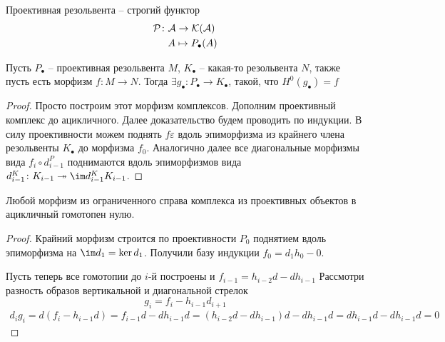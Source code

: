\documentclass[../main.tex]{subfiles}
\begin{document}
\begin{to_suj}\label{tactics}
    Проективная резольвента -- строгий функтор
    \begin{align*}
        \mathcal{P}\colon&\mathcal{A} \to\mathcal{K(A)}\\
         &A \mapsto P_\bullet(A)
    \end{align*}
\end{to_suj}
\begin{to_lem}
    Пусть $P_\bullet$ -- проективная резольвента $M$, $K_\bullet$ -- какая-то резольвента $N$, также пусть есть морфизм $f \colon M \to N$. Тогда $\exists g_\bullet\colon P_\bullet\to K_\bullet$, такой, что $H^0(g_\bullet) = f$
\end{to_lem}
\begin{proof}
    Просто построим этот морфизм комплексов. Дополним проективный комплекс до ацикличного. Далее доказательство будем проводить по индукции.  В силу проективности можем поднять $f\varepsilon$ вдоль эпиморфизма из крайнего члена резольвенты $K_\bullet$ до морфизма $f_0$. Аналогично далее все диагональные морфизмы вида $f_i\circ d_{i-1}^P$ поднимаются вдоль эпиморфизмов вида $d_{i-1}^K\colon K_{i-1}\twoheadrightarrow \im d_{i-1}^K K_{i-1}$.
    \bee
    \eee
\end{proof} 
\begin{to_lem}\label{PtoAc}
    Любой морфизм из ограниченного справа комплекса из проективных объектов в ацикличный гомотопен нулю. 
\end{to_lem}
\begin{proof}
Крайний морфизм строится по проективности $P_0$ поднятием вдоль эпиморфизма на $\im d_1 = \ker d_{1}$. Получили базу индукции $f_0 = d_1 h_0 - 0 $.
        \bee
    \eee
Пусть теперь все гомотопии до $i$-й построены и $f_{i-1} = h_{i-2}d - dh_{i-1}$ Рассмотри разность образов вертикальной и диагональной стрелок 
\[g_i = f_i - h_{i-1} d_{i+1} \]
\begin{align*}
       d_i g_i = d(f_i - h_{i-1}d) = f_{i-1}d - d h_{i-1}d = (h_{i-2}d - d h_{i-1})d - d h_{i-1}d = d h_{i-1} d - d h_{i-1} d = 0
\end{align*}
\end{proof}
\end{document}
